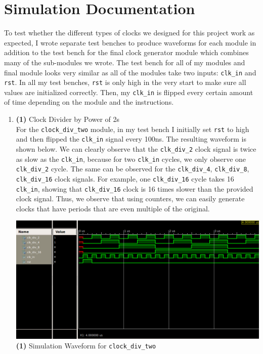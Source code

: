 \documentclass{article}
\begin{document}
\section{Simulation Documentation}
To test whether the different types of clocks we designed for this project work as expected, I wrote separate test benches to produce waveforms for each module in addition to the test bench for the final clock generator module which combines many of the sub-modules we wrote. The test bench for all of my modules and final module looks very similar as all of the modules take two inputs: \texttt{clk\_in} and \texttt{rst}. In all my test benches, \texttt{rst} is only high in the very start to make sure all values are initialized correctly. Then, my \texttt{clk\_in} is flipped every certain amount of time depending on the module and the instructions.
\begin{enumerate}
    \item \textbf{(1)} Clock Divider by Power of 2s \\
    For the \texttt{clock\_div\_two} module, in my test bench I initially set \texttt{rst} to high and then flipped the \texttt{clk\_in} signal every 100ns. The resulting waveform is shown below. We can clearly observe that the \texttt{clk\_div\_2} clock signal is twice as slow as the \texttt{clk\_in}, because for two \texttt{clk\_in} cycles, we only observe one \texttt{clk\_div\_2} cycle. The same can be observed for the \texttt{clk\_div\_4}, \texttt{clk\_div\_8}, \texttt{clk\_div\_16} clock signals. For example, one \texttt{clk\_div\_16} cycle takes 16 \texttt{clk\_in}, showing that \texttt{clk\_div\_16} clock is 16 times slower than the provided clock signal. Thus, we observe that using counters, we can easily generate clocks that have periods that are even multiple of the original. 
    \begin{center}
        \includegraphics[scale=0.4]{waveform-1.png} \\
        \caption{\textbf{(1)} Simulation Waveform for \texttt{clock\_div\_two}}
    \end{center}
    \par
    

\end{enumerate}
\end{document}
